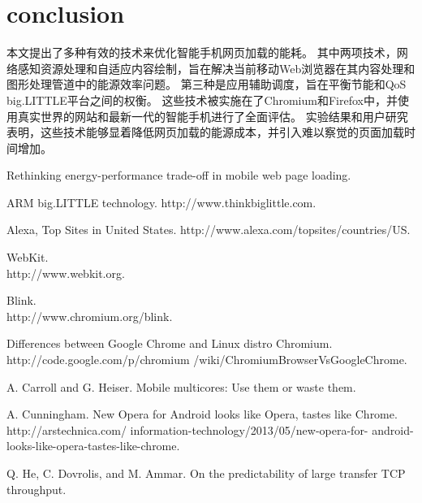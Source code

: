 \documentclass{sig-alternate-05-2015}
\begin{document}
\section{conclusion}

本文提出了多种有效的技术来优化智能手机网页加载的能耗。 其中两项技术，网络感知资源处理和自适应内容绘制，旨在解决当前移动Web浏览器在其内容处理和图形处理管道中的能源效率问题。 第三种是应用辅助调度，旨在平衡节能和QoS big.LITTLE平台之间的权衡。 这些技术被实施在了Chromium和Firefox中，并使用真实世界的网站和最新一代的智能手机进行了全面评估。 实验结果和用户研究表明，这些技术能够显着降低网页加载的能源成本，并引入难以察觉的页面加载时间增加。


\begin{thebibliography}{1}
	\newblock Rethinking energy-performance trade-off in mobile web page loading.
	\newblock {}
	
	\newblock ARM big.LITTLE technology.
	\newblock http://www.thinkbiglittle.com.
	
	\newblock Alexa, Top Sites in United States.
	\newblock http://www.alexa.com/topsites/countries/US.
	
	\newblock WebKit. \\
	\newblock http://www.webkit.org.
	
	\newblock Blink. \\
	\newblock http://www.chromium.org/blink.
	
	\newblock Differences between Google Chrome and Linux distro Chromium. \\
	\newblock http://code.google.com/p/chromium /wiki/ChromiumBrowserVsGoogleChrome.
	
	\newblock A. Carroll and G. Heiser. Mobile multicores: Use them or waste them.
	\newblock {}
	
	\newblock A. Cunningham. New Opera for Android looks like Opera, tastes like Chrome.
	\newblock http://arstechnica.com/ information-technology/2013/05/new-opera-for- android-looks-like-opera-tastes-like-chrome.
	
	\newblock Q. He, C. Dovrolis, and M. Ammar. On the predictability of large transfer TCP throughput.
	\newblock {}
	

\end{thebibliography}
\end{document}
